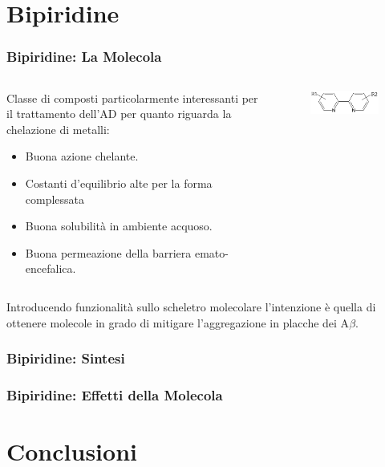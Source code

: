 \documentclass[9pt]{beamer}
\begin{document}
\section{Bipiridine}

\begin{frame}
	\frametitle{Bipiridine: La Molecola}
	\begin{columns}
		\begin{column}{.6\textwidth}
			Classe di composti particolarmente interessanti per il trattamento dell'AD per quanto riguarda la chelazione di metalli:
			\begin{itemize}
				\item Buona azione chelante.
				\item Costanti d'equilibrio alte per la forma complessata
				\item Buona solubilità in ambiente acquoso.
				\item Buona permeazione della barriera emato-encefalica.
			\end{itemize}
		\end{column}
		\begin{column}{.4\textwidth}
			\begin{figure}
				\includegraphics[width=\textwidth]{immagini/bpy.png}
			\end{figure}
		\end{column}
	\end{columns}
	\bigskip
	Introducendo funzionalità sullo scheletro molecolare l'intenzione è quella di ottenere molecole in grado di mitigare l'aggregazione in placche dei A$\beta$.
\end{frame}


\begin{frame}
	\frametitle{Bipiridine: Sintesi}
\end{frame}

\begin{frame}
	\frametitle{Bipiridine: Effetti della Molecola}
\end{frame}

\section{Conclusioni}
\end{document}
